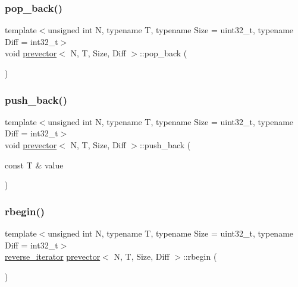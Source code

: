 \subsubsection{\texorpdfstring{pop\+\_\+back()}{pop\_back()}}
{\footnotesize\ttfamily template$<$unsigned int N, typename T, typename Size = uint32\+\_\+t, typename Diff = int32\+\_\+t$>$ \\
void \mbox{\hyperlink{classprevector}{prevector}}$<$ N, T, Size, Diff $>$\+::pop\+\_\+back (\begin{DoxyParamCaption}{ }\end{DoxyParamCaption})\hspace{0.3cm}{\ttfamily [inline]}}

\mbox{\label{classprevector_af34b1eea43f461465aa29fe7ca67449d}} 
\subsubsection{\texorpdfstring{push\+\_\+back()}{push\_back()}}
{\footnotesize\ttfamily template$<$unsigned int N, typename T, typename Size = uint32\+\_\+t, typename Diff = int32\+\_\+t$>$ \\
void \mbox{\hyperlink{classprevector}{prevector}}$<$ N, T, Size, Diff $>$\+::push\+\_\+back (\begin{DoxyParamCaption}\item[{const T \&}]{value }\end{DoxyParamCaption})\hspace{0.3cm}{\ttfamily [inline]}}

\mbox{\label{classprevector_ada5a19cb7dfa0271119cfd17e2bf51e1}} 
\subsubsection{\texorpdfstring{rbegin()}{rbegin()}\hspace{0.1cm}{\footnotesize\ttfamily [1/2]}}
{\footnotesize\ttfamily template$<$unsigned int N, typename T, typename Size = uint32\+\_\+t, typename Diff = int32\+\_\+t$>$ \\
\mbox{\hyperlink{classprevector_1_1reverse__iterator}{reverse\+\_\+iterator}} \mbox{\hyperlink{classprevector}{prevector}}$<$ N, T, Size, Diff $>$\+::rbegin (\begin{DoxyParamCaption}{ }\end{DoxyParamCaption})\hspace{0.3cm}{\ttfamily [inline]}}

